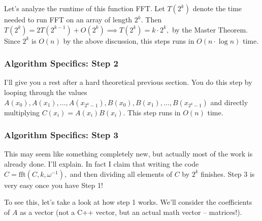 Let's analyze the runtime of this function FFT. Let $T(2^k)$ denote the time needed to run FFT on an array of length $2^k.$ Then $T(2^k) = 2T(2^{k-1}) + O(2^k) \implies T(2^k) = k \cdot 2^k,$ by the Master Theorem. Since $2^k$ is $O(n)$ by the above discussion, this steps runs in $O(n \cdot \log n)$ time.

\subsubsection{Algorithm Specifics: Step 2}

I'll give you a rest after a hard theoretical previous section. You do this step by looping through the values $A(x_0), A(x_1), \dots, A(x_{2^k-1}), B(x_0), B(x_1), \dots, B(x_{2^k-1})$ and directly multiplying $C(x_i) = A(x_i)B(x_i).$ This step runs in $O(n)$ time.

\subsubsection{Algorithm Specifics: Step 3}

This may seem like something completely new, but actually most of the work is already done. I'll explain. In fact I claim that writing the code $C = \text{fft}(C, k, \omega^{-1}),$ and then dividing all elements of $C$ by $2^k$ finishes. Step 3 is very easy once you have Step 1!

To see this, let's take a look at how step 1 works. We'll consider the coefficients of $A$ as a vector (not a C++ vector, but an actual math vector -- matrices!).

\eject

